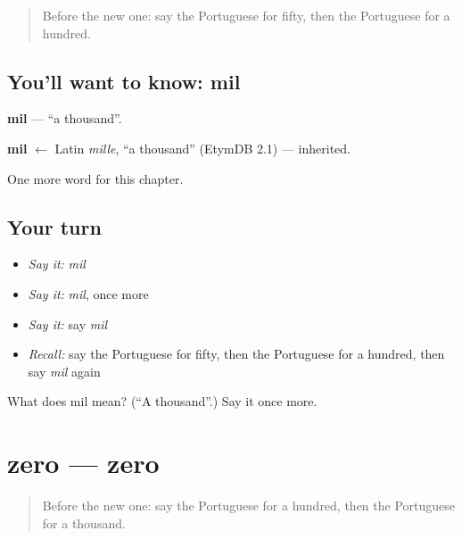 \label{lesson:PT-C79-mil}



\begin{quote}
Before the new one: say the Portuguese for fifty, then the Portuguese for a hundred.
\end{quote}

\subsection*{You'll want to know: mil}
\textbf{mil} — \textquotedblleft{}a thousand\textquotedblright{}.

\begin{cousinweb}
\textbf{mil} $\leftarrow$ Latin \emph{mille}, \textquotedblleft{}a thousand\textquotedblright{} (EtymDB 2.1) — inherited.
\end{cousinweb}

\begin{grammarlens}[title={What you've built}]
One more word for this chapter.
\end{grammarlens}

\subsection*{Your turn}
\begin{itemize}
\raggedright
  \item \emph{Say it:} \emph{mil}
  \item \emph{Say it:} \emph{mil}, once more
  \item \emph{Say it:} say \emph{mil}
  \item \emph{Recall:} say the Portuguese for fifty, then the Portuguese for a hundred, then say \emph{mil} again
\end{itemize}

\begin{tcolorbox}[breakable,colback=teal!4,colframe=teal!35!black,title={Before you move on}]
What does mil mean? (\textquotedblleft{}A thousand\textquotedblright{}.) Say it once more.
\end{tcolorbox}
\section[zero]{zero — zero}

\label{lesson:PT-C79-zero}



\begin{quote}
Before the new one: say the Portuguese for a hundred, then the Portuguese for a thousand.
\end{quote}

